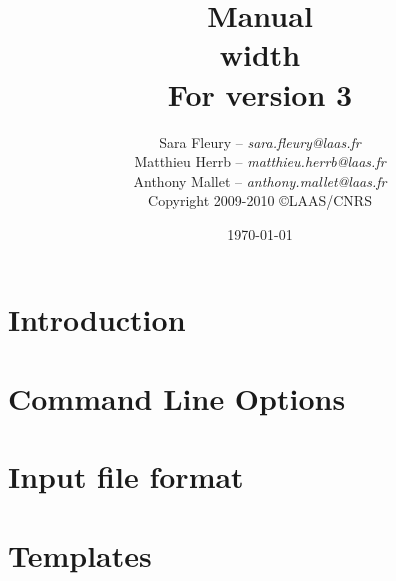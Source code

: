 \documentclass[a4paper,11pt]{book}
\title{{\Huge\bf \GenoM{} Manual}\\ \vrule height 2pt width \linewidth\\
         \hfill\small For \GenoM{} version 3}
\author{
   Sara Fleury -- {\em sara.fleury@laas.fr}\\
   Matthieu Herrb -- {\em matthieu.herrb@laas.fr}\\
   Anthony Mallet -- {\em anthony.mallet@laas.fr}\\[2em]
   Copyright 2009-2010 \copyright LAAS/CNRS
}
\date{\today}
\begin{document}

\frontmatter
\maketitle
\tableofcontents
\mainmatter

\chapter{Introduction}

\chapter{Command Line Options}
\label{chapter:clo}

\chapter{Input file format}
\label{chapter:iff}


\chapter{Templates}
\label{chapter:tmpl}
\label{section:tcl}

\end{document}
